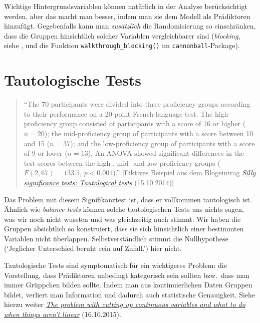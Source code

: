 \documentclass[oneside, 10pt]{book}\usepackage[]{graphicx}\usepackage[]{xcolor}
\begin{document}
 Wichtige Hintergrundsvariablen können natürlich in der Analyse berücksichtigt werden, aber das
 macht man besser, indem man sie dem Modell als Prädiktoren hinzufügt. Gegebenfalls kann man \emph{zusätzlich} die Randomisierung so einschränken, dass die Gruppen hinsichtlich solcher Variablen vergleichbarer sind (\textit{blocking}, siehe \citealp{Imai2008}, \citealp{Vanhove2015}
 und die Funktion \texttt{walkthrough\_blocking()} im \texttt{cannonball}-Package).


\section{Tautologische Tests}
\begin{quote}
``The 70 participants were divided into three proficiency groups 
according to their performance on a 20-point French-language test. 
The high-proficiency group consisted of participants with a score of 
16 or higher ($n = 20$); 
the mid-proficiency group of participants with
a score between 10 and 15 ($n = 37$); 
and the low-proficiency group of 
participants with a score of 9 or lower ($n = 13$). 
An ANOVA showed 
significant differences in the test scores between the high-, mid- 
and low-proficiency groups ($F(2, 67) = 133.5$, $p < 0.001$).''
[Fiktives Beispiel aus dem Blogeintrag \href{https://janhove.github.io/reporting/2014/10/15/tautological-tests}{\textit{Silly significance tests: Tautological tests}} (15.10.2014)]
\end{quote}

Das Problem mit diesem Signifikanztest ist, dass er
vollkommen tautologisch ist. Ähnlich wie \textit{balance tests}
können solche tautologischen Tests uns nichts sagen, was wir
noch nicht wussten und was gleichzeitig auch stimmt: 
Wir haben die Gruppen absichtlich so konstruiert,
dass sie sich hinsichtlich einer bestimmten Variablen
nicht überlappen. Selbstverständlich stimmt die Nullhypothese
(`Jeglicher Unterschied beruht rein auf Zufall.') hier nicht.

Tautologische Tests sind symptomatisch für
ein wichtigeres Problem: die Vorstellung, dass Prädiktoren
unbedingt kategorisch sein sollten bzw.\ dass man immer
Grüppchen bilden sollte. Indem man aus kontinuierlichen
Daten Gruppen bildet, verliert man Information und
dadurch auch statistische Genauigkeit. Siehe hierzu
weiter \href{https://janhove.github.io/analysis/2015/10/16/nonlinear-relationships}{\textit{The problem with cutting up continuous variables and what to do when things aren't linear}} (16.10.2015).
\end{document}
